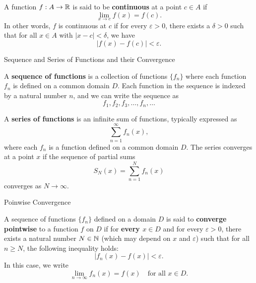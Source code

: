 \documentclass[12pt, a4paper]{article}
\begin{document}
\vspace{100pt}

\begin{definition}
    A function $f:A\to\mathbb{R}$ is said to be \textbf{continuous} at a point $c \in A$ if
\[
\lim_{x \to c} f(x) = f(c).
\]
In other words, $f$ is continuous at $c$ if for every $\varepsilon > 0$, there exists a $\delta > 0$ such that for all $x \in A$ with $|x - c| < \delta$, we have
\[
|f(x) - f(c)| < \varepsilon.
\]
\end{definition}

\clearpage

\begin{heading}
    Sequence and Series of Functions and their Convergence
\end{heading}

\vspace{10pt}

\begin{definition}
    A \textbf{sequence of functions} is a collection of functions $\{f_n\}$ where each function $f_n$ is defined on a common domain $D$. Each function in the sequence is indexed by a natural number $n$, and we can write the sequence as
    \[
    f_1, f_2, f_3, \ldots, f_n, \ldots
    \]
    
\end{definition}

\clearpage

\begin{definition}
    A \textbf{series of functions} is an infinite sum of functions, typically expressed as
    \[
    \sum_{n=1}^{\infty} f_n(x),
    \]
    where each $f_n$ is a function defined on a common domain $D$. The series converges at a point $x$ if the sequence of partial sums
    \[
    S_N(x) = \sum_{n=1}^{N} f_n(x)
    \]
    converges as $N \to \infty$.
    
\end{definition}

\clearpage

\begin{heading}
    Poinwise Convergence
\end{heading}

\vspace{10pt}

\begin{definition}
    A sequence of functions $\{f_n\}$ defined on a domain $D$ is said to \textbf{converge pointwise} to a function $f$ on $D$ if for \textbf{every $x \in D$} and for every $\varepsilon > 0$, there exists a natural number $N \in \mathbb{N}$ (which may depend on $x$ and $\varepsilon$) such that for all $n \geq N$, the following inequality holds:
    \[
    |f_n(x) - f(x)| < \varepsilon.
    \]
    In this case, we write
    \[
    \lim_{n \to \infty} f_n(x) = f(x) \quad \text{for all } x \in D.
    \] 
\end{definition}
\end{document}
